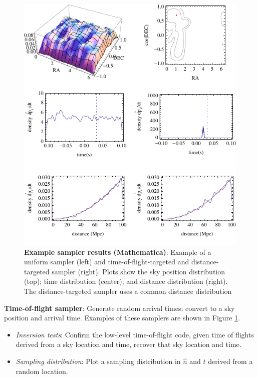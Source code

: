 \documentclass[twocolumn,prd,nofootinbib]{revtex4}
\begin{document}
\begin{widetext}
\begin{figure}
\includegraphics{Figures/fig-mma-DemoSampler.pdf}
\caption{\label{fig:Milestones:DemoSampler:Mathematica}\textbf{Example sampler results (Mathematica)}: Example of a
  uniform sampler (left) and time-of-flight-targeted and distance-targeted sampler (right).  Plots show the sky position distribution (top);
  time distribution (center); and distance distribution (right).   The distance-targeted sampler uses a common distance distribution
}
\end{figure}

\noindent \textbf{Time-of-flight sampler}: Generate random arrival times; convert to a sky position and arrival time.
Examples of these samplers are shown in Figure \ref{fig:Milestones:DemoSampler:Mathematica}.
\begin{itemize}
\item \emph{Inversion tests}: Confirm the low-level time-of-flight code, given time of flights derived from a sky
  location and time, recover that sky location and time.
\item \emph{Sampling distribution}: Plot a sampling distribution in $\hat{n}$ and $t$ derived from a random location. 


\end{itemize}
\end{widetext}
\end{document}
